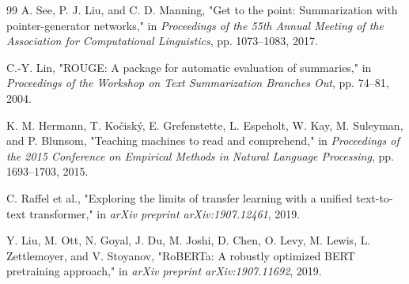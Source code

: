 \documentclass[conference]{IEEEtran}
\begin{document}
\begin{thebibliography}{99}
 A. See, P. J. Liu, and C. D. Manning, "Get to the point: Summarization with pointer-generator networks," in \textit{Proceedings of the 55th Annual Meeting of the Association for Computational Linguistics}, pp. 1073--1083, 2017.

 C.-Y. Lin, "ROUGE: A package for automatic evaluation of summaries," in \textit{Proceedings of the Workshop on Text Summarization Branches Out}, pp. 74--81, 2004.

 K. M. Hermann, T. Ko\v{c}isk\'{y}, E. Grefenstette, L. Espeholt, W. Kay, M. Suleyman, and P. Blunsom, "Teaching machines to read and comprehend," in \textit{Proceedings of the 2015 Conference on Empirical Methods in Natural Language Processing}, pp. 1693--1703, 2015.

 C. Raffel et al., "Exploring the limits of transfer learning with a unified text-to-text transformer," in \textit{arXiv preprint arXiv:1907.12461}, 2019.

 Y. Liu, M. Ott, N. Goyal, J. Du, M. Joshi, D. Chen, O. Levy, M. Lewis, L. Zettlemoyer, and V. Stoyanov, "RoBERTa: A robustly optimized BERT pretraining approach," in \textit{arXiv preprint arXiv:1907.11692}, 2019.

\end{thebibliography}
\end{document}

